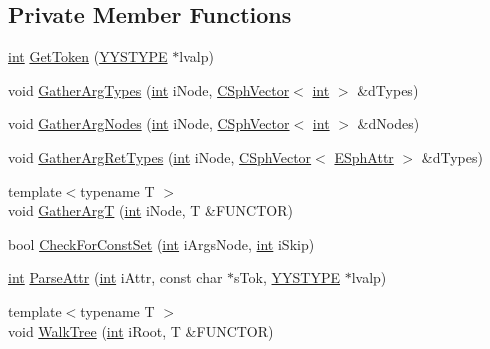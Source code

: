 \subsection*{Private Member Functions}
\begin{DoxyCompactItemize}
\item 
\hyperlink{sphinxexpr_8cpp_a4a26e8f9cb8b736e0c4cbf4d16de985e}{int} \hyperlink{classExprParser__t_a197396f58e42c52e638bc7a6f4c41621}{Get\-Token} (\hyperlink{unionYYSTYPE}{Y\-Y\-S\-T\-Y\-P\-E} $\ast$lvalp)
\item 
void \hyperlink{classExprParser__t_a01e8e2b2361b328648800e63f7bb3f51}{Gather\-Arg\-Types} (\hyperlink{sphinxexpr_8cpp_a4a26e8f9cb8b736e0c4cbf4d16de985e}{int} i\-Node, \hyperlink{classCSphVector}{C\-Sph\-Vector}$<$ \hyperlink{sphinxexpr_8cpp_a4a26e8f9cb8b736e0c4cbf4d16de985e}{int} $>$ \&d\-Types)
\item 
void \hyperlink{classExprParser__t_ac797adf4e35505c9cd62c71fc4a601cf}{Gather\-Arg\-Nodes} (\hyperlink{sphinxexpr_8cpp_a4a26e8f9cb8b736e0c4cbf4d16de985e}{int} i\-Node, \hyperlink{classCSphVector}{C\-Sph\-Vector}$<$ \hyperlink{sphinxexpr_8cpp_a4a26e8f9cb8b736e0c4cbf4d16de985e}{int} $>$ \&d\-Nodes)
\item 
void \hyperlink{classExprParser__t_a77c58fe6bb35d78ba4dfbf0903bef9f7}{Gather\-Arg\-Ret\-Types} (\hyperlink{sphinxexpr_8cpp_a4a26e8f9cb8b736e0c4cbf4d16de985e}{int} i\-Node, \hyperlink{classCSphVector}{C\-Sph\-Vector}$<$ \hyperlink{sphinxexpr_8h_aa883df0db2e4468a107fdd2d2ae625a3}{E\-Sph\-Attr} $>$ \&d\-Types)
\item 
{\footnotesize template$<$typename T $>$ }\\void \hyperlink{classExprParser__t_a19607d599e33856d253a280195a53dc3}{Gather\-Arg\-T} (\hyperlink{sphinxexpr_8cpp_a4a26e8f9cb8b736e0c4cbf4d16de985e}{int} i\-Node, T \&F\-U\-N\-C\-T\-O\-R)
\item 
bool \hyperlink{classExprParser__t_a0d54e936920ec68dd9c7211afc820049}{Check\-For\-Const\-Set} (\hyperlink{sphinxexpr_8cpp_a4a26e8f9cb8b736e0c4cbf4d16de985e}{int} i\-Args\-Node, \hyperlink{sphinxexpr_8cpp_a4a26e8f9cb8b736e0c4cbf4d16de985e}{int} i\-Skip)
\item 
\hyperlink{sphinxexpr_8cpp_a4a26e8f9cb8b736e0c4cbf4d16de985e}{int} \hyperlink{classExprParser__t_af289ac8bb0f09ff8bd3c50976bf10c14}{Parse\-Attr} (\hyperlink{sphinxexpr_8cpp_a4a26e8f9cb8b736e0c4cbf4d16de985e}{int} i\-Attr, const char $\ast$s\-Tok, \hyperlink{unionYYSTYPE}{Y\-Y\-S\-T\-Y\-P\-E} $\ast$lvalp)
\item 
{\footnotesize template$<$typename T $>$ }\\void \hyperlink{classExprParser__t_a67b0ae1b47761deea47634a309c9ef13}{Walk\-Tree} (\hyperlink{sphinxexpr_8cpp_a4a26e8f9cb8b736e0c4cbf4d16de985e}{int} i\-Root, T \&F\-U\-N\-C\-T\-O\-R)

\end{DoxyCompactItemize}
